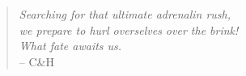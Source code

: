 
%
%

\cleardoublepage

\thispagestyle{empty}
\vspace*{5cm} 
%	
%		
%	

\begin{quote} 
	\begin{flushright}
		
		\textit{Searching for that ultimate adrenalin rush,}\\
		\textit{we prepare to hurl overselves over the brink!}\\
		\textit{What fate awaits us.}\\		
		-- C\&H
		
	\end{flushright}
\end{quote}


\cleardoublepage



